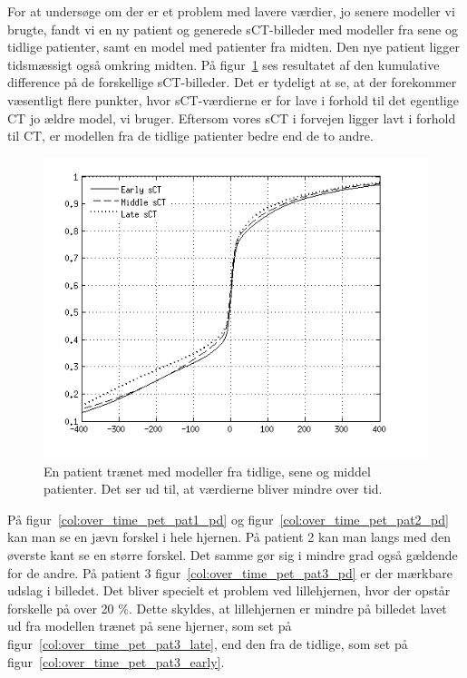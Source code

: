 For at undersøge om der er et problem med lavere værdier, jo senere modeller vi brugte, fandt vi en ny patient og generede sCT-billeder med modeller fra sene og tidlige patienter, samt en model med patienter fra midten. Den nye patient ligger tidsmæssigt også omkring midten. På figur~\ref{cumm_diff_over_tid} ses resultatet af den kumulative difference på de forskellige sCT-billeder. Det er tydeligt at se, at der forekommer væsentligt flere punkter, hvor sCT-værdierne er for lave i forhold til det egentlige CT jo ældre model, vi bruger. Eftersom vores sCT i forvejen ligger lavt i forhold til CT, er modellen fra de tidlige patienter bedre end de to andre.

\begin{figure}
    \includegraphics[width=\textwidth]{billeder/cumm_diff_over_tid.png}
    \caption{En patient trænet med modeller fra tidlige, sene og middel patienter. Det ser ud til, at værdierne bliver mindre over tid.}
    \label{cumm_diff_over_tid}
\end{figure}

På figur~\ref{col:over_time_pet_pat1_pd} og
figur~\ref{col:over_time_pet_pat2_pd} kan man se en jævn forskel i hele
hjernen. På patient 2 kan man langs med den øverste kant se en større
forskel. Det samme gør sig i mindre grad også gældende for de andre.
På patient 3 figur~\ref{col:over_time_pet_pat3_pd} er der mærkbare
udslag i billedet. Det bliver specielt et problem ved lillehjernen, hvor
der opstår forskelle på over 20 \%. Dette skyldes, at lillehjernen
er mindre på billedet lavet ud fra modellen trænet på sene hjerner, som set på figur~\ref{col:over_time_pet_pat3_late}, end den fra de tidlige, som set på figur~\ref{col:over_time_pet_pat3_early}.

